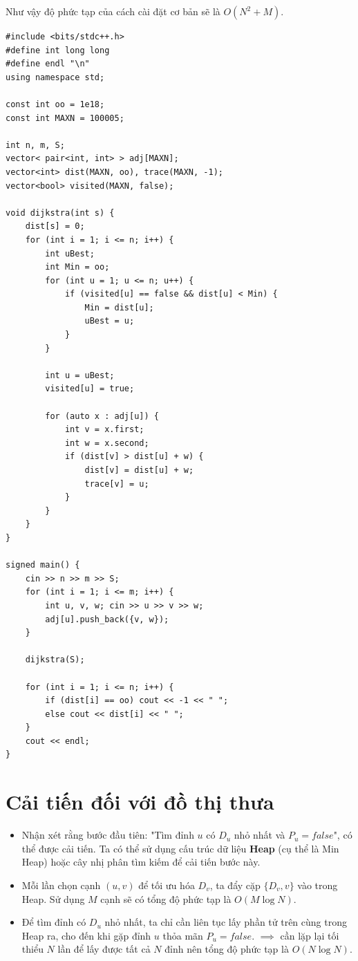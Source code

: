 Như vậy độ phức tạp của cách cài đặt cơ bản sẽ là $O(N^2 + M)$.

\begin{lstlisting}
#include <bits/stdc++.h>
#define int long long
#define endl "\n"
using namespace std;

const int oo = 1e18;
const int MAXN = 100005;

int n, m, S;
vector< pair<int, int> > adj[MAXN];
vector<int> dist(MAXN, oo), trace(MAXN, -1);
vector<bool> visited(MAXN, false);

void dijkstra(int s) {
    dist[s] = 0;
    for (int i = 1; i <= n; i++) {
        int uBest;
        int Min = oo;
        for (int u = 1; u <= n; u++) {
            if (visited[u] == false && dist[u] < Min) {
                Min = dist[u];
                uBest = u;
            }
        }

        int u = uBest;
        visited[u] = true;

        for (auto x : adj[u]) {
            int v = x.first;
            int w = x.second;
            if (dist[v] > dist[u] + w) {
                dist[v] = dist[u] + w;
                trace[v] = u;
            }
        }
    }
}

signed main() {
    cin >> n >> m >> S;
    for (int i = 1; i <= m; i++) {
        int u, v, w; cin >> u >> v >> w;
        adj[u].push_back({v, w});
    }

    dijkstra(S);

    for (int i = 1; i <= n; i++) {
        if (dist[i] == oo) cout << -1 << " ";
        else cout << dist[i] << " ";
    }
    cout << endl;
}
\end{lstlisting}

\section{Cải tiến đối với đồ thị thưa}

\begin{itemize}
    \item Nhận xét rằng bước đầu tiên: "Tìm đỉnh $u$ có $D_u$ nhỏ nhất và $P_u = false$", có thể được cải tiến. Ta có thể sử dụng cấu trúc dữ liệu \textbf{Heap} (cụ thể là Min Heap) hoặc cây nhị phân tìm kiếm để cải tiến bước này.
    \item Mỗi lần chọn cạnh $(u, v)$ để tối ưu hóa $D_v$, ta đẩy cặp $\{D_v, v\}$ vào trong Heap. Sử dụng $M$ cạnh sẽ có tổng độ phức tạp là $O(M \log N)$.
    \item Để tìm đỉnh có $D_u$ nhỏ nhất, ta chỉ cần liên tục lấy phần tử trên cùng trong Heap ra, cho đến khi gặp đỉnh $u$ thỏa mãn $P_u = false$. $\implies$ cần lặp lại tối thiểu $N$ lần để lấy được tất cả $N$ đỉnh nên tổng độ phức tạp là $O(N \log N)$.
\end{itemize}

